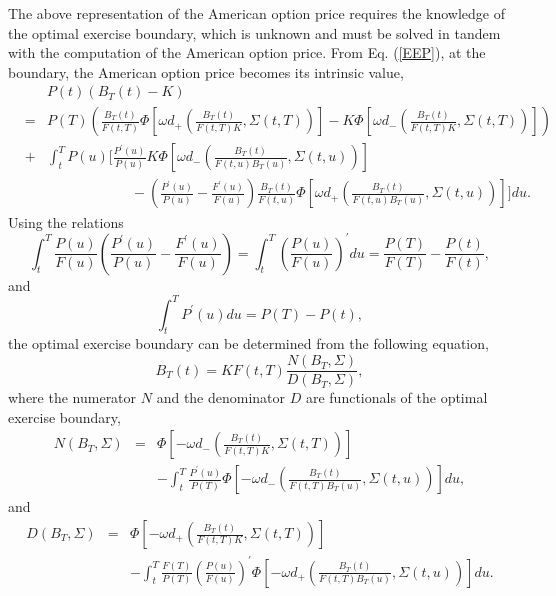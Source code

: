 \documentclass[12pt]{article}
\begin{document}
    The above representation of the American option price requires the knowledge of the optimal
    exercise boundary, which is unknown and must be solved in tandem with the computation of the American
    option price. From Eq. (\ref{EEP}), at the boundary, the American option price becomes its intrinsic
    value,
    \begin{eqnarray}
       \label{Boundary}
       && P(t)\left(B_T(t)-K\right)\nonumber\\
      &=& P(T)\left(\frac{B_T(t)}{F(t,T)}\Phi\left[\omega d_+\left(\frac{B_T(t)}{F(t,T)K},\Sigma(t,T)\right)\right]
                                                      -K\Phi\left[\omega d_-\left(\frac{B_T(t)}{F(t,T)K},\Sigma(t,T)\right)\right]\right)\nonumber\\
       &+&\int_t^TP(u)\Bigg[\frac{P^{\prime}(u)}{P(u)} K
       \Phi\left[\omega d_-\left(\frac{B_T(t)}{F(t,u)B_T(u)}, \Sigma(t,u)\right)\right] \nonumber\\
       &&\quad\quad\quad\quad\quad\quad - \left(\frac{P^{\prime}(u)}{P(u)}-\frac{F^{\prime}(u)}{F(u)}\right)
       \frac{B_T(t)}{F(t,u)}\Phi\left[\omega d_+\left(\frac{B_T(t)}{F(t,u)B_T(u)}, \Sigma(t,u)\right)\right] \Bigg]du.
    \end{eqnarray}
    Using the relations
    \begin{equation}
     \int_t^T \frac{P(u)}{F(u)}\left(\frac{P^{\prime}(u)}{P(u)}-\frac{F^{\prime}(u)}{F(u)}\right)
     = \int_t^T\left(\frac{P(u)}{F(u)}\right)^{\prime}du=\frac{P(T)}{F(T)} - \frac{P(t)}{F(t)},
    \end{equation}
    and
    \begin{equation}
      \int_t^TP^{\prime}(u)du=P(T)-P(t),
    \end{equation}
    the optimal exercise boundary can be determined from the following equation,
    \begin{equation}
      B_T(t)=KF(t,T)\frac{N\left(B_T, \Sigma\right)}{D\left(B_T, \Sigma\right)},
    \end{equation}
    where the numerator $N$ and the denominator $D$ are functionals of the optimal exercise boundary,
    \begin{eqnarray}
      N\left(B_T, \Sigma\right)&=&\Phi\left[-\omega d_-\left(\frac{B_T(t)}{F(t,T)K},\Sigma(t,T)\right)\right]\nonumber\\
      &&-\int_t^T\frac{P^{\prime}(u)}{P(T)}\Phi\left[-\omega d_-\left(\frac{B_T(t)}{F(t,T)B_T(u)},\Sigma(t,u)\right)\right]du,
    \end{eqnarray}
    and
    \begin{eqnarray}
      D\left(B_T, \Sigma\right)&=&\Phi\left[-\omega d_+\left(\frac{B_T(t)}{F(t,T)K},\Sigma(t,T)\right)\right]\nonumber\\
      &&-\int_t^T\frac{F(T)}{P(T)}\left(\frac{P(u)}{F(u)}\right)^{\prime}\Phi\left[-\omega d_+\left(\frac{B_T(t)}{F(t,T)B_T(u)},\Sigma(t,u)\right)\right]du.
    \end{eqnarray}
\end{document}
